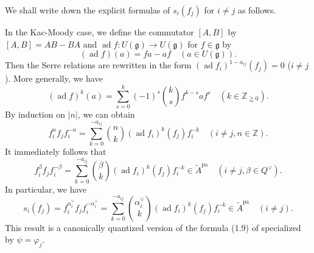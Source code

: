 \documentclass[12pt,twoside]{article}
\newcommand\ad{\mathop{\mathrm{ad}}\nolimits}
\newcommand\av{\alpha^\vee}
\newcommand\Qv{Q^\vee}
\newcommand\tA{{\widetilde A}}
\newcommand\g{{\mathfrak g}}
\newcommand\pa{{\mathrm{pa}}}
\newcommand\Z{{\mathbb Z}} %
\theoremstyle{plain} %
\theoremstyle{definition} %
\theoremstyle{definition} %
\numberwithin{theorem}{section}
\numberwithin{equation}{section}
\numberwithin{figure}{section}
\numberwithin{table}{section}
\begin{document}
We shall write down the explicit formulas of $s_i(f_j)$ for $i\ne j$ as follows.

In the Kac-Moody case, 
we define the commutator $[A,B]$ by $[A,B]=AB-BA$
and $\ad f:U(\g)\to U(\g)$ for $f\in\g$ by
\begin{equation*}
 (\ad f)(a) = fa - af \quad (a\in U(\g)).
\end{equation*}
Then the Serre relations are rewritten 
in the form $(\ad f_i)^{1-a_{ij}}(f_j) = 0$ ($i\ne j$).
More generally, we have
\begin{equation*}
 (\ad f)^k(a) = \sum_{s=0}^k (-1)^s \binom{k}{s} f^{k-s} a f^s
 \quad (k\in\Z_{\geqq0}).
\end{equation*}
By induction on $|n|$, we can obtain
\begin{equation*}
 f_i^nf_jf_i^{-n} 
 = \sum_{k=0}^{-a_{ij}}\binom{n}{k}(\ad f_i)^k(f_j)f_i^{-k}
 \quad (i\ne j, n\in\Z).
\end{equation*}
It immediately follows that
\begin{equation*}
 f_i^{\beta} f_j f_i^{-\beta}
 = \sum_{k=0}^{-a_{ij}}\binom{\beta}{k}(\ad f_i)^k(f_j)f_i^{-k}
 \in \tA^\pa
 \quad (i\ne j, \beta\in\Qv).
\end{equation*}
In particular, we have
\begin{equation}
 s_i(f_j)
 = f_i^{\av_i} f_j f_i^{-\av_i}
 = \sum_{k=0}^{-a_{ij}}\binom{\av_i}{k}(\ad f_i)^k(f_j)f_i^{-k}
 \in \tA^\pa
 \quad (i\ne j).
 \label{eq:s_i(f_j)-KM}
\end{equation}
This result is a canonically quantized version of 
the formula (1.9) of \cite{NY0012028} specialized by $\psi=\varphi_j$.
\end{document}
